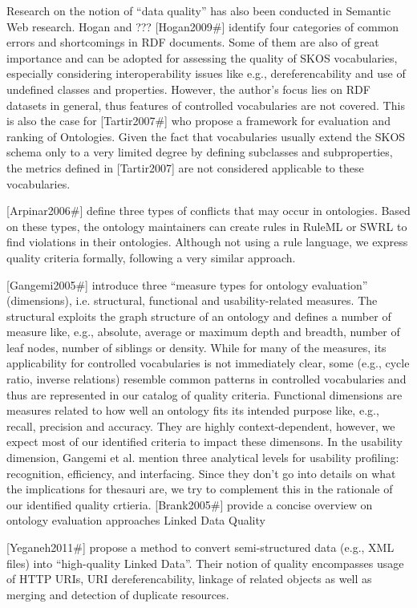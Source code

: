 Research on the notion of “data quality” has also been conducted in Semantic Web research. Hogan and ??? [Hogan2009#] identify four categories of common errors and shortcomings in RDF documents. Some of them are also of great importance and can be adopted for assessing the quality of SKOS vocabularies, especially considering interoperability issues like e.g., dereferencability and use of undefined classes and properties. However, the author’s focus lies on RDF datasets in general, thus features of controlled vocabularies are not covered. This is also the case for [Tartir2007#] who propose a framework for evaluation and ranking of Ontologies. Given the fact that vocabularies usually extend the SKOS schema only to a very limited degree by defining subclasses and subproperties, the metrics defined in [Tartir2007] are not considered applicable to these vocabularies.

[Arpinar2006#] define three types of conflicts that may occur in ontologies. Based on these types, the ontology maintainers can create rules in RuleML or SWRL to find violations in their ontologies. Although not using a rule language, we express quality criteria formally, following a very similar approach.

[Gangemi2005#] introduce three “measure types for ontology evaluation” (dimensions), i.e. structural, functional and usability-related measures. The structural exploits the graph structure of an ontology and defines a number of measure like, e.g., absolute, average or maximum depth and breadth, number of leaf nodes, number of siblings or density. While for many of the measures, its applicability for controlled vocabularies is not immediately clear, some (e.g., cycle ratio, inverse relations) resemble common patterns in controlled vocabularies and thus are represented in our catalog of quality criteria. Functional dimensions are measures related to how well an ontology fits its intended purpose like, e.g., recall, precision and accuracy. They are highly context-dependent, however, we expect most of our identified criteria to impact these dimensons. In the usability dimension, Gangemi et al. mention three analytical levels for usability profiling: recognition, efficiency, and interfacing. Since they don’t go into details on what the implications for thesauri are, we try to complement this in the rationale of our identified quality crtieria. [Brank2005#] provide a concise overview on ontology evaluation approaches
Linked Data Quality

[Yeganeh2011#] propose a method to convert semi-structured data (e.g., XML files) into “high-quality Linked Data”. Their notion of quality encompasses usage of HTTP URIs, URI dereferencability, linkage of related objects as well as merging and detection of duplicate resources.
